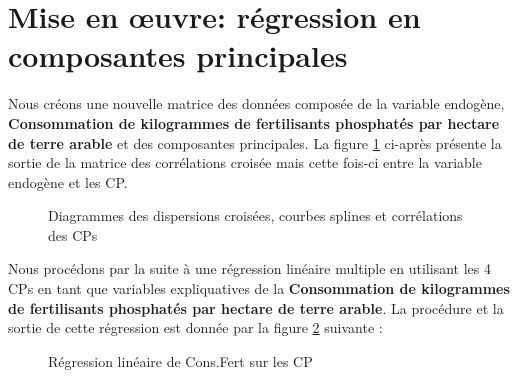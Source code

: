 	\section{Mise en œuvre: régression en composantes principales}
	Nous créons une nouvelle matrice des données composée de la variable endogène, \textbf{Consommation de kilogrammes de fertilisants phosphatés par hectare de terre arable} et des composantes principales.
	La figure \ref{fig:scatter2} ci-après présente la sortie de la matrice des corrélations croisée mais cette fois-ci entre la variable endogène et les CP.
				\begin{figure}[H]
					    		\centering
					    		\caption{Diagrammes des dispersions croisées, courbes splines et corrélations des CPs}
					    		\label{fig:scatter2}
				\end{figure}
	Nous procédons par la suite à une régression linéaire multiple en utilisant les 4 CPs en tant que variables expliquatives de la \textbf{Consommation de kilogrammes de fertilisants phosphatés par hectare de terre arable}. La procédure et la sortie de cette régression est donnée par la figure \ref{fig:PCR} suivante :
					\begin{figure}[H]
						    		\centering
						    		\caption{Régression linéaire de Cons.Fert sur les CP}
						    		\label{fig:PCR}
					\end{figure}
